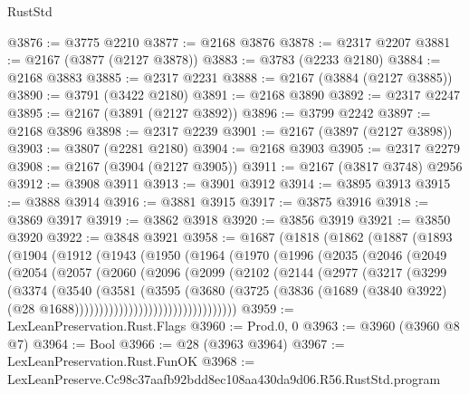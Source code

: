 \begin{lexlean}{RustStd}
\begin{coremodule}
@3876 := @3775 @2210
@3877 := @2168 @3876
@3878 := @2317 @2207
@3881 := @2167 (@3877 (@2127 @3878))
@3883 := @3783 (@2233 @2180)
@3884 := @2168 @3883
@3885 := @2317 @2231
@3888 := @2167 (@3884 (@2127 @3885))
@3890 := @3791 (@3422 @2180)
@3891 := @2168 @3890
@3892 := @2317 @2247
@3895 := @2167 (@3891 (@2127 @3892))
@3896 := @3799 @2242
@3897 := @2168 @3896
@3898 := @2317 @2239
@3901 := @2167 (@3897 (@2127 @3898))
@3903 := @3807 (@2281 @2180)
@3904 := @2168 @3903
@3905 := @2317 @2279
@3908 := @2167 (@3904 (@2127 @3905))
@3911 := @2167 (@3817 @3748) @2956
@3912 := @3908 @3911
@3913 := @3901 @3912
@3914 := @3895 @3913
@3915 := @3888 @3914
@3916 := @3881 @3915
@3917 := @3875 @3916
@3918 := @3869 @3917
@3919 := @3862 @3918
@3920 := @3856 @3919
@3921 := @3850 @3920
@3922 := @3848 @3921
@3958 := @1687
    (@1818
      (@1862
        (@1887
          (@1893
            (@1904
              (@1912
                (@1943
                  (@1950
                    (@1964
                      (@1970
                        (@1996
                          (@2035
                            (@2046
                              (@2049
                                (@2054
                                  (@2057
                                    (@2060
                                      (@2096
                                        (@2099
                                          (@2102
                                            (@2144
                                              (@2977
                                                (@3217
                                                  (@3299
                                                    (@3374
                                                      (@3540
                                                        (@3581
                                                          (@3595
                                                            (@3680
                                                              (@3725
                                                                (@3836
                                                                  (@1689
                                                                    (@3840 @3922)
                                                                    (@28
                                                                      @1688)))))))))))))))))))))))))))))))))
@3959 := LexLeanPreservation.Rust.Flags
@3960 := Prod.{0, 0}
@3963 := @3960 (@3960 @8 @7)
@3964 := Bool
@3966 := @28 (@3963 @3964)
@3967 := LexLeanPreservation.Rust.FunOK
@3968 := LexLeanPreserve.Cc98c37aafb92bdd8ec108aa430da9d06.R56.RustStd.program

\end{coremodule}
\end{lexlean}
